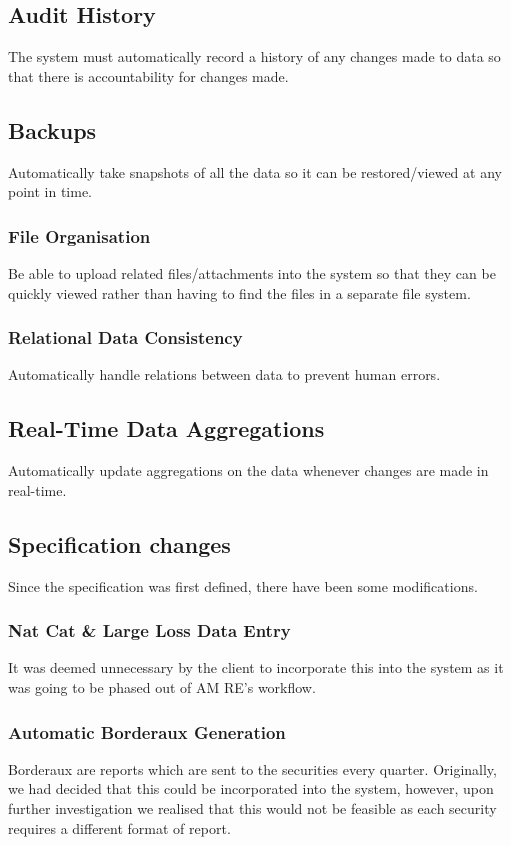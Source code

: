 \documentclass[12pt]{article}
\begin{document}
\subsection*{Audit History}
The system must automatically record a history of any changes made to data so that there is accountability for changes made.
\subsection*{Backups}
Automatically take snapshots of all the data so it can be restored/viewed at any point in time.
\subsubsection*{File Organisation}
Be able to upload related files/attachments into the system so that they can be quickly viewed rather than having to find the files in a separate file system.
\subsubsection*{Relational Data Consistency}
Automatically handle relations between data to prevent human errors.
\subsection*{Real-Time Data Aggregations}
Automatically update aggregations on the data whenever changes are made in real-time.

\subsection{Specification changes}
Since the specification was first defined, there have been some modifications.

\subsubsection*{Nat Cat \& Large Loss Data Entry}
It was deemed unnecessary by the client to incorporate this into the system as it was going to be phased out of AM RE's workflow.
\subsubsection*{Automatic Borderaux Generation}
Borderaux are reports which are sent to the securities every quarter. Originally, we had decided that this could be incorporated into the system, however, upon further investigation we realised that this would not be feasible as each security requires a different format of report.
\end{document}
